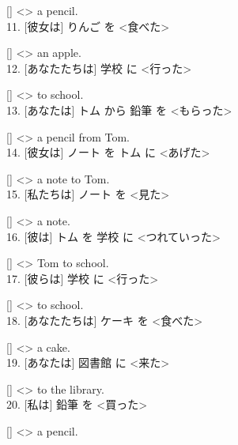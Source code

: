 \documentclass[uplatex,
paper=a4,
fontsize=18pt,
jafontsize=16pt,
number_of_lines=30,
line_length=30zh,
baselineskip=25pt,
]{jlreq}
\begin{document}
  [\hspace{3em}] <\hspace{3em}> a pencil.
\\

11.  [彼女は] りんご を <食べた>

  [\hspace{3em}] <\hspace{3em}> an apple.
\\

12.  [あなたたちは] 学校 に <行った>

  [\hspace{3em}] <\hspace{3em}> to school.
\\

13.  [あなたは] トム から 鉛筆 を <もらった>

  [\hspace{3em}] <\hspace{3em}> a pencil from Tom.
\\

14.  [彼女は] ノート を トム に <あげた>

  [\hspace{3em}] <\hspace{3em}> a note to Tom.
\\

15.  [私たちは] ノート を <見た>

  [\hspace{3em}] <\hspace{3em}> a note.
\\

16.  [彼は] トム を 学校 に <つれていった>

  [\hspace{3em}] <\hspace{3em}> Tom to school.
\\

17.  [彼らは] 学校 に <行った>

  [\hspace{3em}] <\hspace{3em}> to school.
\\

18.  [あなたたちは] ケーキ を <食べた>

  [\hspace{3em}] <\hspace{3em}> a cake.
\\

19.  [あなたは] 図書館 に <来た>

  [\hspace{3em}] <\hspace{3em}> to the library.
\\

20.  [私は] 鉛筆 を <買った>

  [\hspace{3em}] <\hspace{3em}> a pencil.
\\
\end{document}
